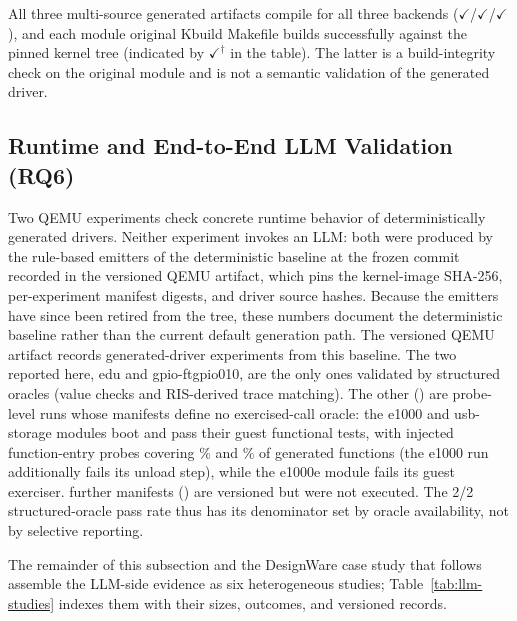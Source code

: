 All three multi-source generated artifacts compile for all three backends
($\checkmark$/$\checkmark$/$\checkmark$), and each module original Kbuild
Makefile builds successfully against the pinned kernel tree (indicated by
$\checkmark^{\dagger}$ in the table). The latter is a build-integrity check on
the original module and is not a semantic validation of the generated driver.

\subsection{Runtime and End-to-End LLM Validation (RQ6)}

Two QEMU experiments check concrete runtime behavior of deterministically
generated drivers. Neither experiment invokes an LLM: both were produced by
the rule-based emitters of the deterministic baseline at the frozen commit
recorded in the versioned QEMU artifact, which pins the kernel-image
SHA-256, per-experiment manifest digests, and driver source hashes. Because
the emitters have since been retired from the tree, these numbers document
the deterministic baseline rather than the current default generation path.
The versioned QEMU artifact records \QEMURecordedExperiments{}
generated-driver experiments from this baseline. The two reported here, edu
and gpio-ftgpio010, are the only ones validated by structured oracles
(value checks and RIS-derived trace matching). The other
\QEMUProbeExperiments{} (\QEMUProbeNames{}) are probe-level runs whose
manifests define no exercised-call oracle: the e1000 and usb-storage
modules boot and pass their guest functional tests, with injected
function-entry probes covering \QEMUProbeNicCoverage\% and
\QEMUProbeUsbCoverage\% of generated functions (the e1000 run additionally
fails its unload step), while the e1000e module fails its guest exerciser.
\QEMUUnexecutedManifests{} further manifests (\QEMUUnexecutedNames{}) are
versioned but were not executed. The 2/2 structured-oracle pass rate thus
has its denominator set by oracle availability, not by selective reporting.

The remainder of this subsection and the DesignWare case study that
follows assemble the LLM-side evidence as six heterogeneous studies;
Table~\ref{tab:llm-studies} indexes them with their sizes, outcomes, and
versioned records.


